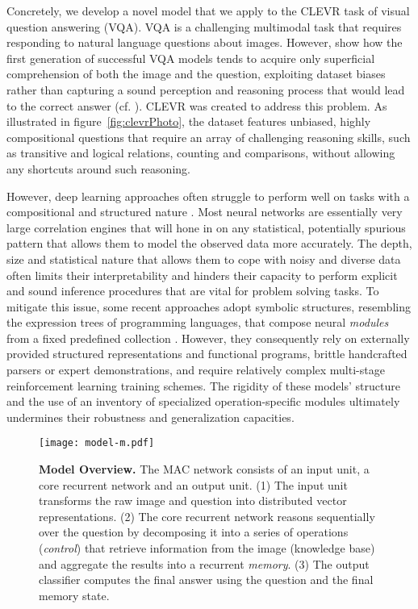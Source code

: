 \documentclass[fleqn]{article}
\newcommand{\figref}[1]{figure~\ref{fig:#1}}
\begin{document}
Concretely, we develop a novel model that we apply to the CLEVR task \citep{clevr} of visual question answering (VQA). VQA \citep{vqa,vqaSurv} is a challenging multimodal task that requires responding to natural language questions about images. However, \citet{clevr1} show how the first generation of successful VQA models tends to acquire only superficial comprehension of both the image and the question, exploiting dataset biases rather than capturing a sound perception and reasoning process that would lead to the correct answer (cf. \citet{clevr35}). CLEVR was created to address this problem. As illustrated in \figref{clevrPhoto}, the dataset features unbiased, highly compositional questions that require an array of challenging reasoning skills, such as transitive and logical relations, counting and comparisons, without allowing any shortcuts around such reasoning.  

However, deep learning approaches often struggle to perform well on tasks with a compositional and structured nature \citep{rl7, rl23}. Most neural networks are essentially very large correlation engines that will hone in on any statistical, potentially spurious pattern that allows them to model the observed data more accurately. The depth, size and statistical nature that allows them to cope with noisy and diverse data often limits their interpretability and hinders their capacity to perform explicit and sound inference procedures that are vital for problem solving tasks. To mitigate this issue, some recent approaches adopt symbolic structures, resembling the expression trees of programming languages, that compose neural \textit{modules} from a fixed predefined collection \citep{nmn,pgee}. However, they consequently rely on externally provided structured representations and functional programs, brittle handcrafted parsers or expert demonstrations, and require relatively complex multi-stage reinforcement learning training schemes. The rigidity of these models' structure and the use of an inventory of specialized operation-specific modules ultimately undermines their robustness and generalization capacities. 


\begin{SCfigure}

\centering
\vspace*{0mm}
\texttt{[image: model-m.pdf]}

\hspace*{-3.5mm}
\caption{\textbf{Model Overview.} The MAC network consists of an input unit, a core recurrent network and an output unit. (1) The input unit transforms the raw image and question into distributed vector representations. (2) The core recurrent network reasons sequentially over the question by decomposing it into a series of operations (\textit{control}) that retrieve information from the image (knowledge base) and aggregate the results into a recurrent \textit{memory}. (3) The output classifier computes the final answer using the question and the final memory state.}

\label{fig:model}
\end{SCfigure}
\end{document}
